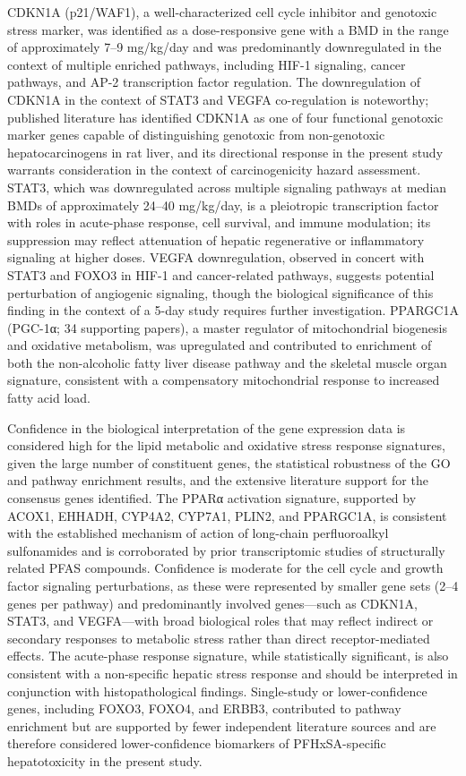 CDKN1A (p21/WAF1), a well-characterized cell cycle inhibitor and genotoxic stress marker, was identified as a dose-responsive gene with a BMD in the range of approximately 7–9 mg/kg/day and was predominantly downregulated in the context of multiple enriched pathways, including HIF-1 signaling, cancer pathways, and AP-2 transcription factor regulation. The downregulation of CDKN1A in the context of STAT3 and VEGFA co-regulation is noteworthy; published literature has identified CDKN1A as one of four functional genotoxic marker genes capable of distinguishing genotoxic from non-genotoxic hepatocarcinogens in rat liver, and its directional response in the present study warrants consideration in the context of carcinogenicity hazard assessment. STAT3, which was downregulated across multiple signaling pathways at median BMDs of approximately 24–40 mg/kg/day, is a pleiotropic transcription factor with roles in acute-phase response, cell survival, and immune modulation; its suppression may reflect attenuation of hepatic regenerative or inflammatory signaling at higher doses. VEGFA downregulation, observed in concert with STAT3 and FOXO3 in HIF-1 and cancer-related pathways, suggests potential perturbation of angiogenic signaling, though the biological significance of this finding in the context of a 5-day study requires further investigation. PPARGC1A (PGC-1α; 34 supporting papers), a master regulator of mitochondrial biogenesis and oxidative metabolism, was upregulated and contributed to enrichment of both the non-alcoholic fatty liver disease pathway and the skeletal muscle organ signature, consistent with a compensatory mitochondrial response to increased fatty acid load.

Confidence in the biological interpretation of the gene expression data is considered high for the lipid metabolic and oxidative stress response signatures, given the large number of constituent genes, the statistical robustness of the GO and pathway enrichment results, and the extensive literature support for the consensus genes identified. The PPARα activation signature, supported by ACOX1, EHHADH, CYP4A2, CYP7A1, PLIN2, and PPARGC1A, is consistent with the established mechanism of action of long-chain perfluoroalkyl sulfonamides and is corroborated by prior transcriptomic studies of structurally related PFAS compounds. Confidence is moderate for the cell cycle and growth factor signaling perturbations, as these were represented by smaller gene sets (2–4 genes per pathway) and predominantly involved genes—such as CDKN1A, STAT3, and VEGFA—with broad biological roles that may reflect indirect or secondary responses to metabolic stress rather than direct receptor-mediated effects. The acute-phase response signature, while statistically significant, is also consistent with a non-specific hepatic stress response and should be interpreted in conjunction with histopathological findings. Single-study or lower-confidence genes, including FOXO3, FOXO4, and ERBB3, contributed to pathway enrichment but are supported by fewer independent literature sources and are therefore considered lower-confidence biomarkers of PFHxSA-specific hepatotoxicity in the present study.

